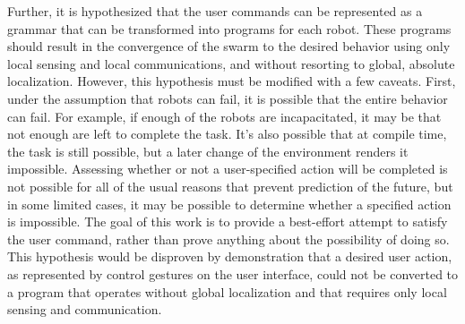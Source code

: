 Further, it is hypothesized that the user commands can be represented as a grammar that can be transformed into programs for each robot. 
These programs should result in the convergence of the swarm to the desired behavior using only local sensing and local communications, and without resorting to global, absolute localization. 
However, this hypothesis must be modified with a few caveats. 
First, under the assumption that robots can fail, it is possible that the entire behavior can fail. 
For example, if enough of the robots are incapacitated, it may be that not enough are left to complete the task. 
It's also possible that at compile time, the task is still possible, but a later change of the environment renders it impossible. 
Assessing whether or not a user-specified action will be completed is not possible for all of the usual reasons that prevent prediction of the future, but in some limited cases, it may be possible to determine whether a specified action is impossible. The goal of this work is to provide a best-effort attempt to satisfy the user command, rather than prove anything about the possibility of doing so. 
This hypothesis would be disproven by demonstration that a desired user action, as represented by control gestures on the user interface, could not be converted to a program that operates without global localization and that requires only local sensing and communication.

